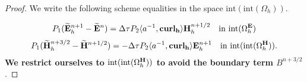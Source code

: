 \documentclass[12pt,reqno]{amsart}
\newcommand{\acurl}{\langle a^{-1},{\bf curl_h}\rangle}
\newcommand{\e}{{\bf E}}
\newcommand{\h}{{\bf H}}
\theoremstyle{definition}
\numberwithin{equation}{section}
\newcommand{\intr}[1]{\mathrm{int}(#1)}
\def\Gwh{\Omega_h}
\begin{document}
\begin{proof}
	
	We write the following scheme equalities in the space $\intr{\intr\Gwh}$.
	
	\begin{align}
		P_1(\widetilde{\e}_h^{n+1} -\widetilde{\e}^{n})=
		\Delta \tau P_2 \acurl \h_h^{n+1/2} \quad \mathrm{in} \  \intr{\Gwh^\e}
	\end{align}
	\begin{align}
		P_1(\widetilde{\h}_h^{n+3/2} -\widetilde{\h}^{n+1/2})
		=
		-\Delta \tau P_2 \acurl \e_h^{n+1}  \quad \mathrm{in} \  \intr{\intr{\Gwh^\h}}.
	\end{align}
{ \bf
We restrict ourselves to $ \intr{\intr{\Gwh^\h}}$ to avoid the boundary term $B^{n+3/2}$}.
	


\end{proof}
\end{document}
